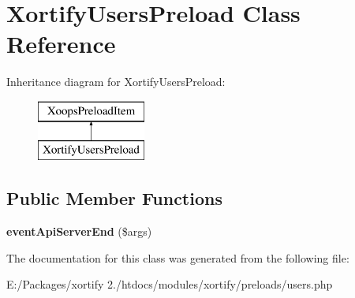 \hypertarget{class_xortify_users_preload}{\section{Xortify\-Users\-Preload Class Reference}
\label{class_xortify_users_preload}
}
Inheritance diagram for Xortify\-Users\-Preload\-:\begin{figure}[H]
\begin{center}
\leavevmode
\includegraphics[height=2.000000cm]{class_xortify_users_preload}
\end{center}
\end{figure}
\subsection*{Public Member Functions}
\begin{DoxyCompactItemize}
\item 
\hypertarget{class_xortify_users_preload_aefff1f3c14d2705c2cc4de04658bb350}{{\bfseries event\-Api\-Server\-End} (\$args)}\label{class_xortify_users_preload_aefff1f3c14d2705c2cc4de04658bb350}

\end{DoxyCompactItemize}


The documentation for this class was generated from the following file\-:\begin{DoxyCompactItemize}
\item 
E\-:/\-Packages/xortify 2./htdocs/modules/xortify/preloads/users.\-php\end{DoxyCompactItemize}
